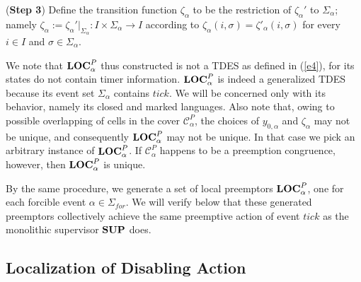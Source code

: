 \documentclass[twocolumn]{autart}
\begin{document}
({\bf Step 3}) Define the transition function $\zeta_\alpha$ to be
the restriction of $\zeta_\alpha'$ to $\Sigma_\alpha$; namely
$\zeta_\alpha := \zeta_\alpha'|_{\Sigma_\alpha}: I \times
\Sigma_\alpha \rightarrow I$ { according to
$\zeta_\alpha(i,\sigma) = \zeta'_\alpha(i,\sigma)$ for every $i \in
I$ and $\sigma \in \Sigma_\alpha$.}

We note that ${\bf LOC}^P_{\alpha}$ thus constructed is not a TDES
as defined in (\ref{e4}), for its states do not contain timer
information. ${\bf LOC}^P_{\alpha}$ is indeed a generalized TDES
because its event set $\Sigma_\alpha$ contains $tick$. We will be
concerned only with its behavior, namely its closed and marked
languages. Also note that, owing to possible overlapping of cells in
the cover $\mathcal{C}^P_{\alpha}$, the choices of $y_{0,\alpha}$
and $\zeta_{\alpha}$ may not be unique, and consequently ${\bf
LOC}^P_{\alpha}$ may not be unique. In that case we pick an
arbitrary instance of ${\bf LOC}^P_{\alpha}$. If
$\mathcal{C}^P_{\alpha}$ happens to be a preemption congruence,
however, then ${\bf LOC}^P_{\alpha}$ is unique.

By the same procedure, we generate a set of local preemptors ${\bf
LOC}^P_{\alpha}$, one for each forcible event $\alpha \in
\Sigma_{for}$.  We will verify below that these generated preemptors
collectively achieve the same preemptive action of event $tick$ as
the monolithic supervisor $\bf SUP$ does.

\subsection{Localization of Disabling Action} \label{sec:4.2}
\end{document}
